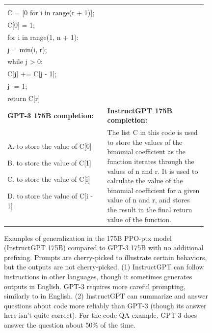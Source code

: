 \documentclass{article}
\begin{document}
\begin{figure}[tp]
\begin{tabular}{p{0.48\linewidth} p{0.48\linewidth}}
{\begin{minipage}{\linewidth}
        \vspace{5pt}\texttt{def binomial\_coefficient(n, r): \\
        \hspace*{2em} C = [0 for i in range(r + 1)]; \\
        \hspace*{2em} C[0] = 1; \\
        \hspace*{2em} for i in range(1, n + 1): \\
        \hspace*{2em} \hspace*{2em} j = min(i, r); \\
        \hspace*{2em} \hspace*{2em} while j > 0: \\
        \hspace*{2em} \hspace*{2em} \hspace*{2em} C[j] += C[j - 1]; \\
        \hspace*{2em} \hspace*{2em} \hspace*{2em} j -= 1; \\
        \hspace*{2em} return C[r]
        }
        \end{minipage}\vspace{5pt}
    } \\
    \midrule
    \textbf{GPT-3 175B completion:} & \textbf{InstructGPT 175B completion:} \\
        A. to store the value of C[0]

        B. to store the value of C[1]

        C. to store the value of C[i]

        D. to store the value of C[i - 1]
    &
        The list C in this code is used to store the values of the binomial coefficient as the function iterates through the values of n and r. It is used to calculate the value of the binomial coefficient for a given value of n and r, and stores the result in the final return value of the function.  \\
    \bottomrule
    \end{tabular}
    \caption{Examples of generalization in the 175B PPO-ptx model (InstructGPT 175B) compared to GPT-3 175B with no additional prefixing. Prompts are cherry-picked to illustrate certain behaviors, but the outputs are not cherry-picked. (1) InstructGPT can follow instructions in other languages, though it sometimes generates outputs in English. GPT-3 requires more careful prompting, similarly to in English. (2) InstructGPT can summarize and answer questions about code more reliably than GPT-3 (though its answer here isn't quite correct). For the code QA example, GPT-3 does answer the question about 50\% of the time.}
    \label{fig:qual_ex_1}
\end{figure}
\end{document}
